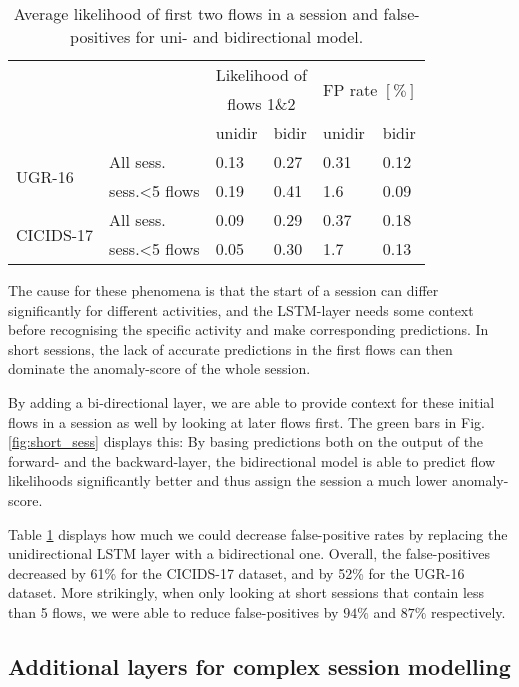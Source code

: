 \begin{table}[ht]
\centering
\begin{tabular}{l|l|l|l|l|l}
& & \multicolumn{2}{c|}{Likelihood of}&\multicolumn{2}{c}{\multirow{2}{*}{FP rate $[\%]$}}\\
& & \multicolumn{2}{c|}{flows 1\&2} &\multicolumn{2}{c}{} \\
&& unidir & bidir& unidir& bidir\\  \hline \hline
\multirow{2}{*}{UGR-16}&All sess.& 0.13&0.27 &0.31 & 0.12\\  \cline{2-6}
&sess.<5 flows& 0.19 & 0.41 & 1.6& 0.09\\  \hline \hline
\multirow{2}{*}{CICIDS-17}&All sess.& 0.09& 0.29& 0.37& 0.18\\  \cline{2-6}
&sess.<5 flows& 0.05 & 0.30 & 1.7& 0.13\\  \hline
\end{tabular}
\caption{Average likelihood of first two flows in a session and false-positives for uni- and bidirectional model.}\label{Tab:bidir}
\end{table}
The cause for these phenomena is that the start of a session can differ significantly for different activities, and the LSTM-layer needs some context before recognising the specific activity and make corresponding predictions. In short sessions, the lack of accurate predictions in the first flows can then dominate the anomaly-score of the whole session.

By adding a bi-directional layer, we are able to provide context for these initial flows in a session as well by looking at later flows first. The green bars in Fig. \ref{fig:short_sess} displays this: By basing predictions both on the output of the forward- and the backward-layer, the bidirectional model is able to predict flow likelihoods significantly better and thus assign the session a much lower anomaly-score.




Table \ref{Tab:bidir} displays how much we could decrease false-positive rates by replacing the unidirectional LSTM layer with a bidirectional one. Overall, the false-positives decreased by 61\% for the CICIDS-17 dataset, and by 52\% for the UGR-16 dataset. More strikingly, when only looking at short sessions that contain less than 5 flows, we were able to reduce false-positives by $94\%$ and $87\%$ respectively.


\subsection{Additional layers for complex session modelling}\label{Sec:depth}



